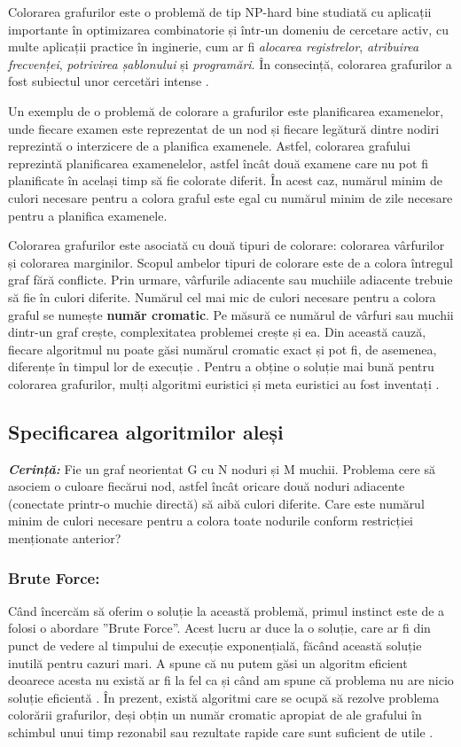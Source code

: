 \documentclass[runningheads]{llncs}
\begin{document}
Colorarea grafurilor este o problemă de tip NP-hard bine studiată cu aplicații 
importante în optimizarea combinatorie și într-un domeniu de cercetare activ, cu 
multe aplicații practice \cite{4} în inginerie, cum ar fi \textit{alocarea registrelor}, 
\textit{atribuirea frecvenței}, \textit{potrivirea șablonului} și \textit{programări}. 
În consecință, colorarea grafurilor a fost subiectul unor cercetări intense \cite{5} \cite{2}.

Un exemplu de o problemă de colorare a grafurilor este planificarea examenelor, unde
fiecare examen este reprezentat de un nod și fiecare legătură dintre nodiri reprezintă
o interzicere de a planifica examenele. Astfel, colorarea grafului reprezintă planificarea
examenelelor, astfel încât două examene care nu pot fi planificate în același timp să fie
colorate diferit. În acest caz, numărul minim de culori necesare pentru a colora graful
este egal cu numărul minim de zile necesare pentru a planifica examenele. \cite{6}

Colorarea grafurilor este asociată cu două tipuri de colorare: colorarea vârfurilor 
și colorarea marginilor. Scopul ambelor tipuri de colorare este de a colora întregul graf fără
conflicte. Prin urmare, vârfurile adiacente sau muchiile adiacente trebuie
să fie în culori diferite. Numărul cel mai mic de culori necesare 
pentru a colora graful se numește \textbf{număr cromatic}.
Pe măsură ce numărul de vârfuri sau muchii dintr-un graf crește,
complexitatea problemei crește și ea. Din această cauză, fiecare
algoritmul nu poate găsi numărul cromatic exact  
și pot fi, de asemenea, diferențe în timpul lor de execuție \cite{7}. Pentru a obține 
o soluție mai bună pentru colorarea grafurilor, mulți algoritmi euristici și meta
euristici au fost inventați \cite{8}.
% 
\subsection{Specificarea algoritmilor aleși}

\textbf{\textit{Cerință:}} Fie un graf neorientat G cu N noduri și M muchii. Problema cere să asociem o culoare 
fiecărui nod, astfel încât oricare două noduri adiacente (conectate printr-o muchie directă) 
să aibă culori diferite. Care este numărul minim de culori necesare pentru a colora 
toate nodurile conform restricției menționate anterior? \cite{9}

\subsubsection{Brute Force:}
Când încercăm să oferim o soluție la această problemă, primul instinct este de a
folosi o abordare ”Brute Force”. Acest lucru ar duce la o soluție, care ar fi 
din punct de vedere al timpului de execuție exponențială, făcând această soluție 
inutilă pentru cazuri mari. A spune că nu putem găsi un algoritm eficient 
deoarece acesta nu există ar fi la fel ca și când am spune că problema nu are 
nicio soluție eficientă \cite{10}.
În prezent, există algoritmi care se ocupă să rezolve problema colorării grafurilor, 
deși obțin un număr cromatic apropiat de ale grafului în schimbul unui timp
rezonabil sau rezultate rapide care sunt suficient de utile \cite{11}.
\end{document}
